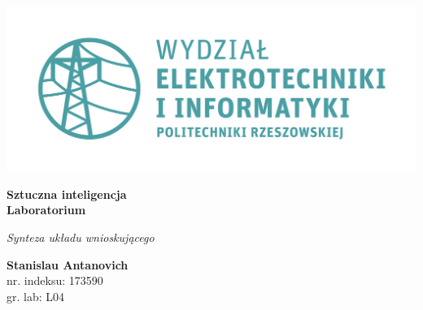 \documentclass[a4paper, 10pt]{article}
\begin{document}
\begin{titlepage}
\begin{center}
	\includegraphics[scale=0.7]{logo.png}

	\vspace*{4cm}
	\textbf{Sztuczna inteligencja\\ Laboratorium}

	\vspace{1.5cm}
	\textit{Synteza układu wnioskującego}

	\vspace{1.5cm}
	\textbf{Stanislau Antanovich}\\
	nr. indeksu: 173590\\
	gr. lab: L04
\end{center}
\end{titlepage}

\tableofcontents
\listoffigures

\newpage






\end{document}
